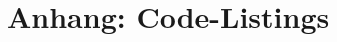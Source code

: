 \documentclass[a4paper,11pt,bibliography=totoc,listof=totoc,headinclude=true,cleardoublepage=empty,oneside]{scrartcl}
\newcommand{\R}{\mathbb{R}}
\begin{document}
\section{Anhang: Code-Listings}

\end{document}
